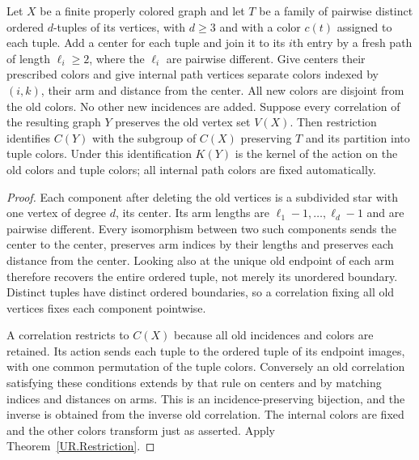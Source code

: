 \begin{theorem}\label{UR.RigidArms}
Let $X$ be a finite properly colored graph and let $T$ be a family of
pairwise distinct ordered $d$-tuples of its vertices, with $d\ge3$ and
with a color $c(t)$ assigned to each tuple. Add a center for each tuple
and join it to its $i$th entry by a fresh path of length $\ell_i\ge2$,
where the $\ell_i$ are pairwise different. Give centers their prescribed
colors and give internal path vertices separate colors indexed by
$(i,k)$, their arm and distance from the center. All new colors are
disjoint from the old colors. No other new incidences are added.
Suppose every correlation of the resulting graph $Y$ preserves the old
vertex set $V(X)$. Then restriction identifies $C(Y)$ with the subgroup
of $C(X)$ preserving $T$ and its partition into tuple colors. Under this
identification $K(Y)$ is the kernel of the action on the old colors and
tuple colors; all internal path colors are fixed automatically.
\end{theorem}
\begin{proof}
Each component after deleting the old vertices is a subdivided star with
one vertex of degree $d$, its center. Its arm lengths are
$\ell_1-1,\ldots,\ell_d-1$ and are pairwise different. Every isomorphism
between two such components sends the center to the center, preserves
arm indices by their lengths and preserves each distance from the
center. Looking also at the unique old endpoint of each arm therefore
recovers the entire ordered tuple, not merely its unordered boundary.
Distinct tuples have distinct ordered boundaries, so a correlation
fixing all old vertices fixes each component pointwise.

A correlation restricts to $C(X)$ because all old incidences and colors
are retained. Its action sends each tuple to the ordered tuple of its
endpoint images, with one common permutation of the tuple colors.
Conversely an old correlation satisfying these conditions extends by
that rule on centers and by matching indices and distances on arms.
This is an incidence-preserving bijection, and the inverse is obtained
from the inverse old correlation. The internal colors are fixed and
the other colors transform just as asserted. Apply
Theorem~\ref{UR.Restriction}.
\end{proof}
